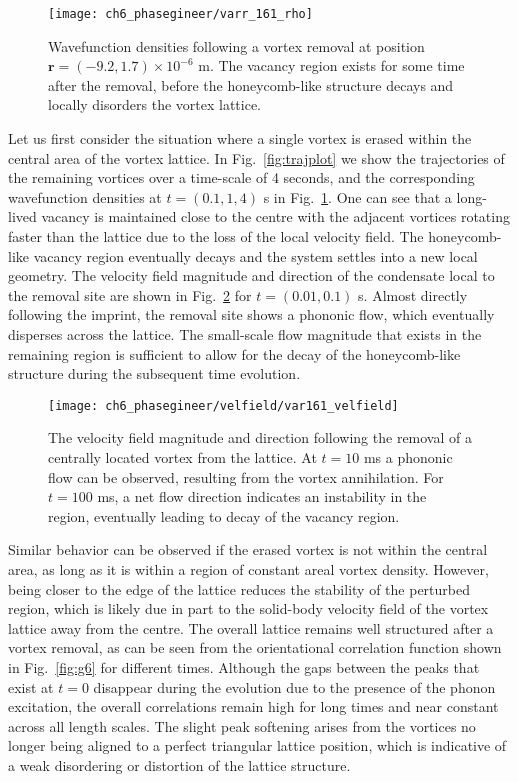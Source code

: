 \begin{figure}\centering
\texttt{[image: ch6\_phasegineer/varr\_161\_rho]}
    \caption{ Wavefunction densities following a vortex removal at position  $\mathbf{r} = (-9.2,1.7)\times 10^{-6}$ m. The vacancy region exists for some time after the removal, before the honeycomb-like structure decays and locally disorders the vortex lattice. }
    \label{fig:varr161_rho}
\end{figure}
Let us first consider the situation where a single vortex is erased within the central area of the vortex lattice. In Fig.~\ref{fig:trajplot} we show the trajectories of the remaining vortices over a time-scale of 4 seconds, and the corresponding wavefunction densities at $t=(0.1,1,4)$ s in Fig.~\ref{fig:varr161_rho}. One can see that a long-lived vacancy is maintained close to the centre with the adjacent vortices rotating faster than the lattice due to the loss of the local velocity field. The honeycomb-like vacancy region eventually decays and the system settles into a new local geometry. The velocity field magnitude and direction of the condensate local to the removal site are shown in Fig.~\ref{fig:varr161_velfield} for $t=(0.01,0.1)$ s. Almost directly following the imprint, the removal site shows a phononic flow, which eventually disperses across the lattice. The small-scale flow magnitude that exists in the remaining region is sufficient to allow for the decay of the honeycomb-like structure during the subsequent time evolution.

\begin{figure}\centering
    \texttt{[image: ch6\_phasegineer/velfield/var161\_velfield]}
    \caption{The velocity field magnitude and direction following the removal of a centrally located vortex from the lattice. At $t=10$ ms a phononic flow can be observed, resulting from the vortex annihilation. For $t=100$ ms, a net flow direction indicates an instability in the region, eventually leading to decay of the vacancy region. }\label{fig:varr161_velfield}
\end{figure}

Similar behavior can be observed if the erased vortex is not within the central area, as long as it is within a region of constant areal vortex density. However, being closer to the edge of the lattice reduces the stability of the perturbed region, which is likely due in part to the solid-body velocity field of the vortex lattice away from the centre. The overall lattice remains well structured after a vortex removal, as can be seen from the orientational correlation function shown in Fig.~\ref{fig:g6} for different times. Although the gaps between the peaks that exist at $t=0$ disappear during the evolution due to the presence of the phonon excitation, the overall correlations remain high for long times and near constant across all length scales. The slight peak softening arises from the vortices no longer being aligned to a perfect triangular lattice position, which is indicative of a weak disordering or distortion of the lattice structure.

